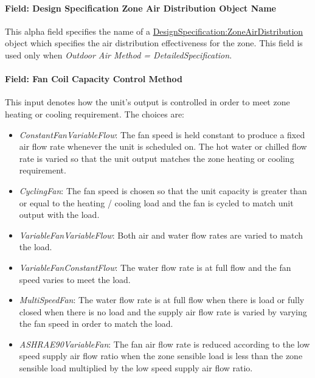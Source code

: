 \paragraph{Field: Design Specification Zone Air Distribution Object Name}\label{field-design-specification-zone-air-distribution-object-name-1}

This alpha field specifies the name of a \hyperref[designspecificationzoneairdistribution]{DesignSpecification:ZoneAirDistribution} object which specifies the air distribution effectiveness for the zone. This field is used only when \emph{Outdoor Air Method = DetailedSpecification}.

\paragraph{Field: Fan Coil Capacity Control Method}\label{field-fan-coil-capacity-control-method}

This input denotes how the unit's output is controlled in order to meet zone heating or cooling requirement. The choices are:
\begin{itemize}
\item
  \emph{ConstantFanVariableFlow}: The fan speed is held constant to produce a fixed air flow rate whenever the unit is scheduled on. The hot water or chilled flow rate is varied so that the unit output matches the zone heating or cooling requirement.
\item
  \emph{CyclingFan}: The fan speed is chosen so that the unit capacity is greater than or equal to the heating / cooling load and the fan is cycled to match unit output with the load.
\item
  \emph{VariableFanVariableFlow}: Both air and water flow rates are varied to match the load.
\item
  \emph{VariableFanConstantFlow}: The water flow rate is at full flow and the fan speed varies to meet the load.
\item
  \emph{MultiSpeedFan}: The water flow rate is at full flow when there is load or fully closed when there is no load and the supply air flow rate is varied by varying the fan speed in order to match the load.
\item
  \emph{ASHRAE90VariableFan}: The fan air flow rate is reduced according to the low speed supply air flow ratio when the zone sensible load is less than the zone sensible load multiplied by the low speed supply air flow ratio.
\end{itemize}

